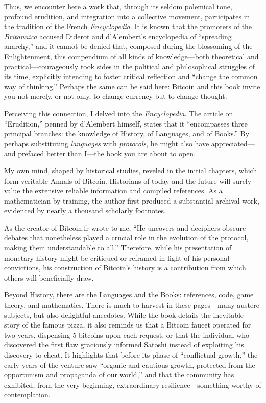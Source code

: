 \documentclass[
  a5paper,
  smalldemyvopaper,10pt,twoside,onecolumn,openright,extrafontsizes,hidelinks]{memoir}
\begin{document}
Thus, we encounter here a work that, through its seldom polemical tone,
profound erudition, and integration into a collective movement,
participates in the tradition of the French \emph{Encyclopedia}. It is
known that the promoters of the \emph{Britannica} accused Diderot and
d'Alembert's encyclopedia of ``spreading anarchy,'' and it cannot be
denied that, composed during the blossoming of the Enlightenment, this
compendium of all kinds of knowledge---both theoretical and
practical---courageously took sides in the political and philosophical
struggles of its time, explicitly intending to foster critical
reflection and ``change the common way of thinking.'' Perhaps the same
can be said here: Bitcoin and this book invite you not merely, or not
only, to change currency but to change thought.

Perceiving this connection, I delved into the \emph{Encyclopedia}. The
article on ``Erudition,'' penned by d'Alembert himself, states that it
``encompasses three principal branches: the knowledge of History, of
Languages, and of Books.'' By perhaps substituting \emph{languages} with
\emph{protocols}, he might also have appreciated---and prefaced better
than I---the book you are about to open.

My own mind, shaped by historical studies, reveled in the initial
chapters, which form veritable Annals of Bitcoin. Historians of today
and the future will surely value the extensive reliable information and
compiled references. As a mathematician by training, the author first
produced a substantial archival work, evidenced by nearly a thousand
scholarly footnotes.

As the creator of Bitcoin.fr wrote to me, ``He uncovers and deciphers
obscure debates that nonetheless played a crucial role in the evolution
of the protocol, making them understandable to all.'' Therefore, while
his presentation of monetary history might be critiqued or reframed in
light of his personal convictions, his construction of Bitcoin's history
is a contribution from which others will beneficially draw.

Beyond History, there are the Languages and the Books: references, code,
game theory, and mathematics. There is much to harvest in these
pages---many austere subjects, but also delightful anecdotes. While the
book details the inevitable story of the famous pizza, it also reminds
us that a Bitcoin faucet operated for two years, dispensing 5 bitcoins
upon each request, or that the individual who discovered the first flaw
graciously informed Satoshi instead of exploiting his discovery to
cheat. It highlights that before its phase of ``conflictual growth,''
the early years of the venture saw ``organic and cautious growth,
protected from the opportunism and propaganda of our world,'' and that
the community has exhibited, from the very beginning, extraordinary
resilience---something worthy of contemplation.
\end{document}
